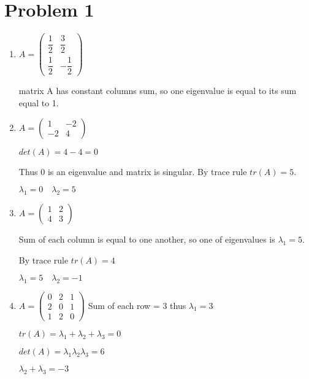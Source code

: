 \documentclass[12pt,letterpaper]{article}
\begin{document}
\section*{Problem 1}

\begin{enumerate}[label=(\alph*)]
    \item
        $A = \begin{pmatrix}
            \dfrac{1}{2} & \dfrac{3}{2} \\
            \dfrac{1}{2} & -\dfrac{1}{2}
        \end{pmatrix}$
        
        matrix A has constant columns sum, so one eigenvalue is equal to its sum equal to 1.
    \item
        $A = \begin{pmatrix}
            1 & -2 \\
            -2 & 4
        \end{pmatrix}$
        
        $det(A) = 4 - 4 = 0$
        
        Thus 0 is an eigenvalue and matrix is singular. By trace rule $tr(A) = 5$.
        
        $\lambda_1 = 0\quad\lambda_2 = 5$
    \item
        $A = \begin{pmatrix}
            1 & 2 \\
            4 & 3
        \end{pmatrix}$
        
        Sum of each column is equal to one another, so one of eigenvalues is $\lambda_1 = 5$.
        
        By trace rule $tr(A) = 4$
        
        $\lambda_1 = 5\quad\lambda_ 2 = -1$
    \item
        $A = \begin{pmatrix}
            0 & 2 & 1 \\
            2 & 0 & 1 \\
            1 & 2 & 0
        \end{pmatrix}$
        Sum of each row = 3 thus $\lambda_1 = 3$
        
        $tr(A) = \lambda_1 + \lambda_2 + \lambda_3 = 0$
        
        $det(A) = \lambda_1\lambda_2\lambda_3 = 6$
        
        $\lambda_2 + \lambda_3 = -3$
        

\end{enumerate}
\end{document}
